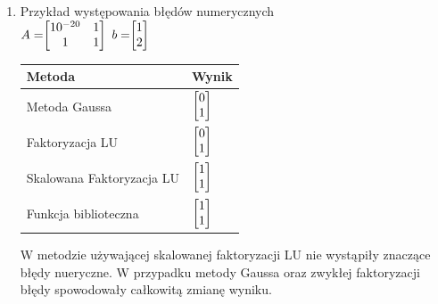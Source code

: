 \documentclass[11pt, a4paper]{article}
\begin{document}
\begin{enumerate}

\item Przykład występowania błędów numerycznych\\

\begin{math}
A = $$
\begin{bmatrix}
10^{-20}&1\\
1&1\\
\end{bmatrix}
$$
\end{math}
\begin{math}
b = $$
\begin{bmatrix}
1\\
2\\
\end{bmatrix}
$$
\end{math}

\begin{center}
    \begin{tabular}{| l | l |}
    \hline
    Metoda & Wynik\\ \hline
    Metoda Gaussa &  \begin{math}
$$
\begin{bmatrix}
0\\
1\\
\end{bmatrix}
$$
\end{math}\\ \hline
    Faktoryzacja LU & \begin{math}
    $$
\begin{bmatrix}
0\\
1\\
\end{bmatrix}
$$
\end{math}\\ \hline
    Skalowana Faktoryzacja LU & \begin{math}
$$
\begin{bmatrix}
1\\
1\\
\end{bmatrix}
$$
\end{math}\\ \hline
    Funkcja biblioteczna& \begin{math}
$$
\begin{bmatrix}
1\\
1\\
\end{bmatrix}
$$
\end{math}\\ \hline
    \end{tabular}
\end{center}
W metodzie używającej skalowanej faktoryzacji LU nie wystąpiły znaczące błędy nueryczne. W przypadku metody Gaussa oraz zwykłej faktoryzacji błędy spowodowały całkowitą zmianę wyniku.


\end{enumerate}
\end{document}
